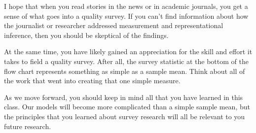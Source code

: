 \documentclass[11pt]{lecturenotes}
\begin{document}
I hope that when you read stories in the news or in academic journals, you get a sense of what goes into a quality survey. If you can't find information about how the journalist or researcher addressed measurement and representational inference, then you should be skeptical of the findings. 

At the same time, you have likely gained an appreciation for the skill and effort it takes to field a quality survey. After all, the survey statistic at the bottom of the flow chart represents something as simple as a sample mean. Think about all of the work that went into creating that one simple measure.

As we move forward, you should keep in mind all that you have learned in this class. Our models will become more complicated than a simple sample mean, but the principles that you learned about survey research will all be relevant to you future research. 
\end{document}
